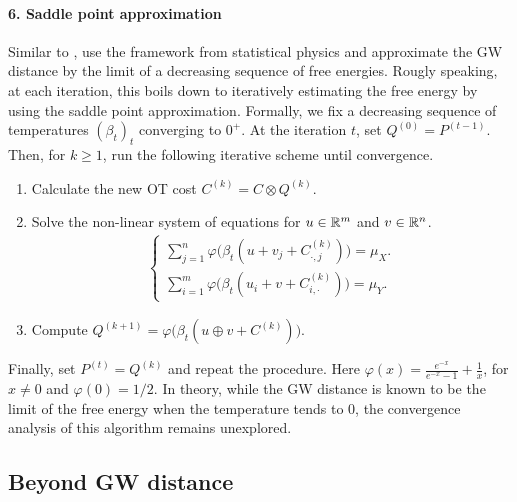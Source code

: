 \paragraph{6. Saddle point approximation} Similar to \citep{Koehl19},
\citep{Koehl23} use the framework from statistical physics and approximate the GW distance by
the limit of a decreasing sequence of free energies. Rougly speaking, at each iteration,
this boils down to iteratively estimating the free energy by using the saddle point approximation.
Formally, we fix a decreasing sequence of temperatures $(\beta_t)_t$ converging to $0^+$.
At the iteration $t$, set $Q^{(0)} = P^{(t-1)}$. Then, for $k \geq 1$,
run the following iterative scheme until convergence.
\begin{enumerate}
  \item Calculate the new OT cost $C^{(k)} = C \otimes Q^{(k)}$.
  \item Solve the non-linear system of equations for $u \in \mathbb R^m$ and $v \in \mathbb R^n$.
  \begin{align}
    \begin{cases}
      \sum\limits_{j=1}^n \varphi \big( \beta_t (u + v_j + C^{(k)}_{\cdot, j}) \big) = \mu_X. \\
      \sum\limits_{i=1}^m \varphi \big( \beta_t (u_i + v + C^{(k)}_{i, \cdot}) \big) = \mu_Y.
    \end{cases}
  \end{align}
  \item Compute $Q^{(k+1)} = \varphi \big( \beta_t (u \oplus v + C^{(k)}) \big)$.
\end{enumerate}
Finally, set $P^{(t)} = Q^{(k)}$ and repeat the procedure.
Here $\varphi(x) = \frac{e^{-x}}{e^{-x} - 1} + \frac{1}{x}$, for $x \neq 0$ and $\varphi(0) = 1/2$.
In theory, while the GW distance is known to be the limit of the free energy when
the temperature tends to $0$, the convergence analysis of this algorithm remains unexplored.

\subsection{Beyond GW distance}
\label{subsec:beyond_gw}


